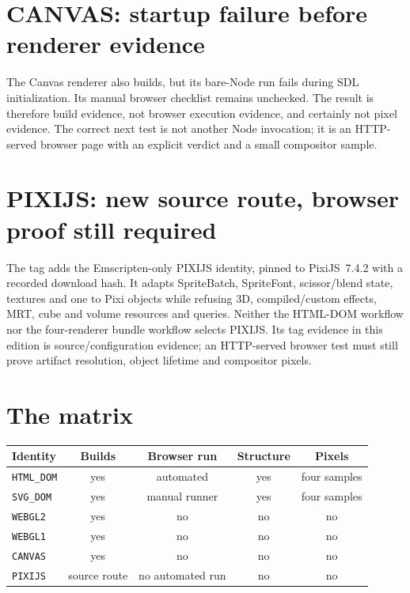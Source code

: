 \section{CANVAS: startup failure before renderer evidence}

The Canvas renderer also builds, but its bare-Node run fails during SDL initialization.  Its
manual browser checklist remains unchecked.  The result is therefore build evidence, not
browser execution evidence, and certainly not pixel evidence.  The correct next test is not
another Node invocation; it is an HTTP-served browser page with an explicit verdict and a
small compositor sample.

\section{PIXIJS: new source route, browser proof still required}

The tag adds the Emscripten-only PIXIJS identity, pinned to PixiJS~7.4.2 with a recorded download
hash.  It adapts SpriteBatch, SpriteFont, scissor/blend state, textures and one
 to Pixi objects while refusing 3D, compiled/custom effects, MRT, cube and
volume resources and queries.  Neither the HTML-DOM workflow nor the four-renderer bundle workflow
selects PIXIJS.  Its tag evidence in this edition is source/configuration evidence; an HTTP-served
browser test must still prove artifact resolution, object lifetime and compositor pixels.

\section{The matrix}

\begin{center}
\small
\begin{tabular}{lcccc}
\toprule
Identity & Builds & Browser run & Structure & Pixels \\
\midrule
\texttt{HTML\_DOM} & yes & automated & yes & four samples \\
\texttt{SVG\_DOM}  & yes & manual runner & yes & four samples \\
\texttt{WEBGL2}    & yes & no & no & no \\
\texttt{WEBGL1}    & yes & no & no & no \\
\texttt{CANVAS}    & yes & no & no & no \\
\texttt{PIXIJS}    & source route & no automated run & no & no \\
\bottomrule
\end{tabular}
\end{center}

